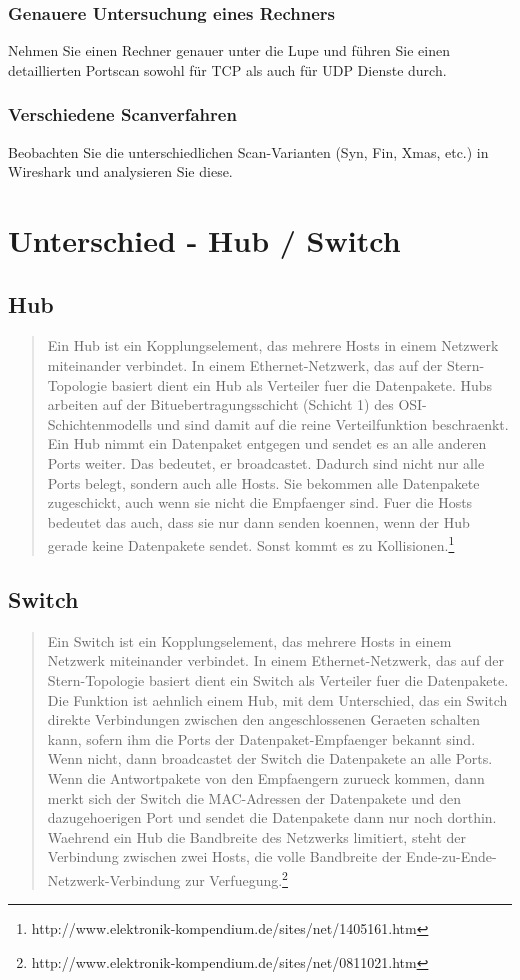 \documentclass[a4paper]{report}
\begin{document}
\subsection{Genauere Untersuchung eines Rechners}
Nehmen Sie einen Rechner genauer unter die Lupe und führen Sie einen detaillierten Portscan sowohl für TCP als auch für UDP Dienste durch.
\subsection{Verschiedene Scanverfahren}
Beobachten Sie die unterschiedlichen Scan-Varianten (Syn, Fin, Xmas, etc.) in Wireshark und analysieren Sie diese.

\chapter{Unterschied - Hub / Switch}

\section{Hub}
\begin{quote}
Ein Hub ist ein Kopplungselement, das mehrere Hosts in einem Netzwerk miteinander verbindet. In einem Ethernet-Netzwerk, das auf der Stern-Topologie basiert dient ein Hub als Verteiler fuer die Datenpakete. Hubs arbeiten auf der Bituebertragungsschicht (Schicht 1) des OSI-Schichtenmodells und sind damit auf die reine Verteilfunktion beschraenkt.
Ein Hub nimmt ein Datenpaket entgegen und sendet es an alle anderen Ports weiter. Das bedeutet, er broadcastet. Dadurch sind nicht nur alle Ports belegt, sondern auch alle Hosts. Sie bekommen alle Datenpakete zugeschickt, auch wenn sie nicht die Empfaenger sind. Fuer die Hosts bedeutet das auch, dass sie nur dann senden koennen, wenn der Hub gerade keine Datenpakete sendet. Sonst kommt es zu Kollisionen.\footnote{http://www.elektronik-kompendium.de/sites/net/1405161.htm} \end{quote}


\section{Switch}
\begin{quote}
Ein Switch ist ein Kopplungselement, das mehrere Hosts in einem Netzwerk miteinander verbindet. In einem Ethernet-Netzwerk, das auf der Stern-Topologie basiert dient ein Switch als Verteiler fuer die Datenpakete.
Die Funktion ist aehnlich einem Hub, mit dem Unterschied, das ein Switch direkte Verbindungen zwischen den angeschlossenen Geraeten schalten kann, sofern ihm die Ports der Datenpaket-Empfaenger bekannt sind. Wenn nicht, dann broadcastet der Switch die Datenpakete an alle Ports. Wenn die Antwortpakete von den Empfaengern zurueck kommen, dann merkt sich der Switch die MAC-Adressen der Datenpakete und den dazugehoerigen Port und sendet die Datenpakete dann nur noch dorthin.
Waehrend ein Hub die Bandbreite des Netzwerks limitiert, steht der Verbindung zwischen zwei Hosts, die volle Bandbreite der Ende-zu-Ende-Netzwerk-Verbindung zur Verfuegung.\footnote{http://www.elektronik-kompendium.de/sites/net/0811021.htm}
\end{quote}
\end{document}
